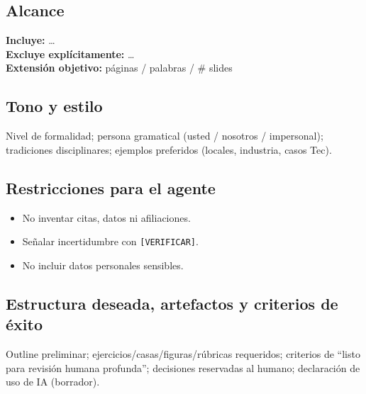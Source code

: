 \subsection*{Alcance}
\textbf{Incluye:} \ldots\\
\textbf{Excluye explícitamente:} \ldots\\
\textbf{Extensión objetivo:} páginas / palabras / \# slides

\subsection*{Tono y estilo}
Nivel de formalidad; persona gramatical (usted / nosotros / impersonal); tradiciones disciplinares; ejemplos preferidos (locales, industria, casos Tec).

\subsection*{Restricciones para el agente}
\begin{itemize}
\item No inventar citas, datos ni afiliaciones.
\item Señalar incertidumbre con \texttt{[VERIFICAR]}.
\item No incluir datos personales sensibles.
\end{itemize}

\subsection*{Estructura deseada, artefactos y criterios de éxito}
Outline preliminar; ejercicios/casas/figuras/rúbricas requeridos; criterios de ``listo para revisión humana profunda''; decisiones reservadas al humano; declaración de uso de IA (borrador).
